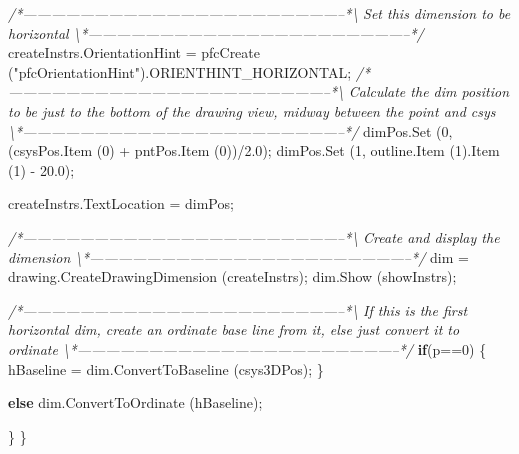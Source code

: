 \documentclass[]{article}
\newenvironment{Shaded}{}{}
\newcommand{\KeywordTok}[1]{\textcolor[rgb]{0.00,0.44,0.13}{\textbf{{#1}}}}
\newcommand{\DecValTok}[1]{\textcolor[rgb]{0.25,0.63,0.44}{{#1}}}
\newcommand{\FloatTok}[1]{\textcolor[rgb]{0.25,0.63,0.44}{{#1}}}
\newcommand{\StringTok}[1]{\textcolor[rgb]{0.25,0.44,0.63}{{#1}}}
\newcommand{\CommentTok}[1]{\textcolor[rgb]{0.38,0.63,0.69}{\textit{{#1}}}}
\newcommand{\OtherTok}[1]{\textcolor[rgb]{0.00,0.44,0.13}{{#1}}}
\newcommand{\FunctionTok}[1]{\textcolor[rgb]{0.02,0.16,0.49}{{#1}}}
\newcommand{\NormalTok}[1]{{#1}}
\begin{document}
\begin{Shaded}
\begin{Highlighting}[]
\CommentTok{/*--------------------------------------------------------------------*\textbackslash{}   }
\CommentTok{  Set this dimension to be horizontal}
\CommentTok{\textbackslash{}*--------------------------------------------------------------------*/}   
      \OtherTok{createInstrs}\NormalTok{.}\FunctionTok{OrientationHint} \NormalTok{=}
    \FunctionTok{pfcCreate} \NormalTok{(}\StringTok{"pfcOrientationHint"}\NormalTok{).}\FunctionTok{ORIENTHINT_HORIZONTAL}\NormalTok{;}
\CommentTok{/*--------------------------------------------------------------------*\textbackslash{}    }
\CommentTok{  Calculate the dim position to be just to the bottom of the}
\CommentTok{  drawing view, midway between the point and csys}
\CommentTok{\textbackslash{}*--------------------------------------------------------------------*/}   
      \OtherTok{dimPos}\NormalTok{.}\FunctionTok{Set} \NormalTok{(}\DecValTok{0}\NormalTok{, (}\OtherTok{csysPos}\NormalTok{.}\FunctionTok{Item} \NormalTok{(}\DecValTok{0}\NormalTok{) + }\OtherTok{pntPos}\NormalTok{.}\FunctionTok{Item} \NormalTok{(}\DecValTok{0}\NormalTok{))/}\FloatTok{2.0}\NormalTok{);}
      \OtherTok{dimPos}\NormalTok{.}\FunctionTok{Set} \NormalTok{(}\DecValTok{1}\NormalTok{, }\OtherTok{outline}\NormalTok{.}\FunctionTok{Item} \NormalTok{(}\DecValTok{1}\NormalTok{).}\FunctionTok{Item} \NormalTok{(}\DecValTok{1}\NormalTok{) - }\FloatTok{20.0}\NormalTok{);}
      
      \OtherTok{createInstrs}\NormalTok{.}\FunctionTok{TextLocation} \NormalTok{= dimPos;}
      
\CommentTok{/*--------------------------------------------------------------------*\textbackslash{}    }
\CommentTok{  Create and display the dimension}
\CommentTok{\textbackslash{}*--------------------------------------------------------------------*/} 
      \NormalTok{dim = }\OtherTok{drawing}\NormalTok{.}\FunctionTok{CreateDrawingDimension} \NormalTok{(createInstrs);}
      \OtherTok{dim}\NormalTok{.}\FunctionTok{Show} \NormalTok{(showInstrs);}
      
\CommentTok{/*--------------------------------------------------------------------*\textbackslash{}     }
\CommentTok{  If this is the first horizontal dim, create an ordinate base line}
\CommentTok{  from it, else just convert it to ordinate}
\CommentTok{\textbackslash{}*--------------------------------------------------------------------*/}   
      \KeywordTok{if}\NormalTok{(p==}\DecValTok{0}\NormalTok{)}
    \NormalTok{\{}
      \NormalTok{hBaseline = }\OtherTok{dim}\NormalTok{.}\FunctionTok{ConvertToBaseline} \NormalTok{(csys3DPos);}
    \NormalTok{\}}
      
      \KeywordTok{else}
    \OtherTok{dim}\NormalTok{.}\FunctionTok{ConvertToOrdinate} \NormalTok{(hBaseline);}
      
    \NormalTok{\}}
\NormalTok{\}}
\end{Highlighting}
\end{Shaded}
\end{document}
